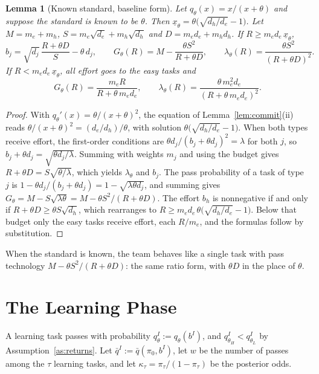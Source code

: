 \documentclass[11pt]{article}
\newtheorem{lemma}{Lemma}
\theoremstyle{definition}
\begin{document}
\begin{lemma}[Known standard, baseline form]\label{lem:closed}
Let $q_\theta(x)=x/(x+\theta)$ and suppose the standard is known to be $\theta$. Then $\underline x_\theta=\theta\bigl(\sqrt{d_h/d_e}-1\bigr)$. Let $M=m_e+m_h$, $S=m_e\sqrt{d_e}+m_h\sqrt{d_h}$ and $D=m_e d_e+m_h d_h$. If $R\ge m_e d_e\,\underline x_\theta$,
\[
b_j=\sqrt{d_j}\,\frac{R+\theta D}{S}-\theta\,d_j,\qquad
G_\theta(R)=M-\frac{\theta S^2}{R+\theta D},\qquad
\lambda_\theta(R)=\frac{\theta S^2}{(R+\theta D)^2}.
\]
If $R<m_e d_e\,\underline x_\theta$, all effort goes to the easy tasks and
\[
G_\theta(R)=\frac{m_e R}{R+\theta\,m_e d_e},\qquad
\lambda_\theta(R)=\frac{\theta\,m_e^2 d_e}{(R+\theta\,m_e d_e)^2}.
\]
\end{lemma}

\begin{proof}
With $q_\theta'(x)=\theta/(x+\theta)^2$, the equation of Lemma~\ref{lem:commit}(ii) reads $\theta/(x+\theta)^2=(d_e/d_h)/\theta$, with solution $\theta\bigl(\sqrt{d_h/d_e}-1\bigr)$. When both types receive effort, the first-order conditions are $\theta d_j/(b_j+\theta d_j)^2=\lambda$ for both $j$, so $b_j+\theta d_j=\sqrt{\theta d_j/\lambda}$. Summing with weights $m_j$ and using the budget gives $R+\theta D=S\sqrt{\theta/\lambda}$, which yields $\lambda_\theta$ and $b_j$. The pass probability of a task of type $j$ is $1-\theta d_j/(b_j+\theta d_j)=1-\sqrt{\lambda\theta d_j}$, and summing gives $G_\theta=M-S\sqrt{\lambda\theta}=M-\theta S^2/(R+\theta D)$. The effort $b_h$ is nonnegative if and only if $R+\theta D\ge\theta S\sqrt{d_h}$, which rearranges to $R\ge m_e d_e\,\theta\bigl(\sqrt{d_h/d_e}-1\bigr)$. Below that budget only the easy tasks receive effort, each $R/m_e$, and the formulas follow by substitution.
\end{proof}

When the standard is known, the team behaves like a single task with pass technology $M-\theta S^2/(R+\theta D)$: the same ratio form, with $\theta D$ in the place of $\theta$.

\section{The Learning Phase}

A learning task passes with probability $q_\theta^I:=q_\theta(b^I)$, and $q_{\theta_H}^I<q_{\theta_L}^I$ by Assumption~\ref{as:returns}. Let $\bar q^I:=\bar q(\pi_0,b^I)$, let $w$ be the number of passes among the $\tau$ learning tasks, and let $\kappa_\tau=\pi_\tau/(1-\pi_\tau)$ be the posterior odds.
\end{document}
